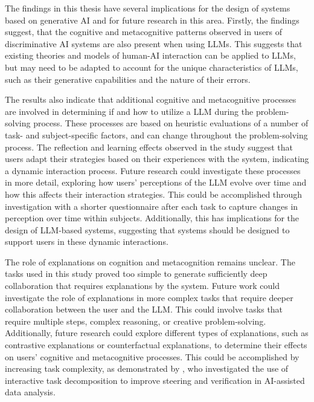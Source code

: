 The findings in this thesis have several implications for the design of systems based on generative \ac{AI} and for future research in this area. Firstly, the findings suggest, that the cognitive and metacognitive patterns observed in users of discriminative \ac{AI} systems are also present when using \acp{LLM}. This suggests that existing theories and models of human-AI interaction can be applied to \acp{LLM}, but may need to be adapted to account for the unique characteristics of \acp{LLM}, such as their generative capabilities and the nature of their errors.

The results also indicate that additional cognitive and metacognitive processes are involved in determining if and how to utilize a \ac{LLM} during the problem-solving process. These processes are based on heuristic evaluations of a number of task- and subject-specific factors, and can change throughout the problem-solving process. The reflection and learning effects observed in the study suggest that users adapt their strategies based on their experiences with the system, indicating a dynamic interaction process. Future research could investigate these processes in more detail, exploring how users' perceptions of the \ac{LLM} evolve over time and how this affects their interaction strategies. This could be accomplished through investigation with a shorter questionnaire after each task to capture changes in perception over time within subjects. Additionally, this has implications for the design of \ac{LLM}-based systems, suggesting that systems should be designed to support users in these dynamic interactions.

The role of explanations on cognition and metacognition remains unclear. The tasks used in this study proved too simple to generate sufficiently deep collaboration that requires explanations by the system. Future work could investigate the role of explanations in more complex tasks that require deeper collaboration between the user and the \ac{LLM}. This could involve tasks that require multiple steps, complex reasoning, or creative problem-solving. Additionally, future research could explore different types of explanations, such as contrastive explanations or counterfactual explanations, to determine their effects on users' cognitive and metacognitive processes. This could be accomplished by increasing task complexity, as demonstrated by \textcite{Kazemitabaar2024}, who investigated the use of interactive task decomposition to improve steering and verification in AI-assisted data analysis.


